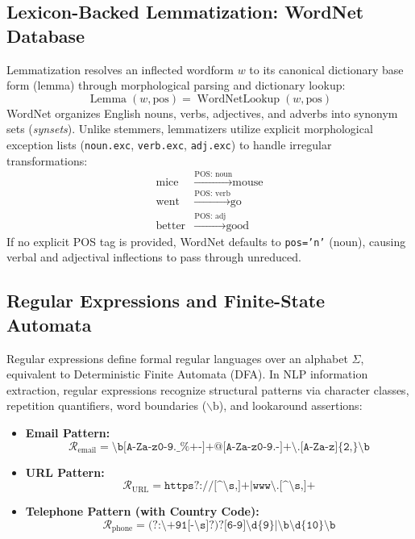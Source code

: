 \subsection{Lexicon-Backed Lemmatization: WordNet Database}
Lemmatization resolves an inflected wordform $w$ to its canonical dictionary base form (lemma) through morphological parsing and dictionary lookup:
\begin{equation}
    \operatorname{Lemma}(w, \text{pos}) = \operatorname{WordNetLookup}(w, \text{pos})
\end{equation}
WordNet organizes English nouns, verbs, adjectives, and adverbs into synonym sets (\textit{synsets}). Unlike stemmers, lemmatizers utilize explicit morphological exception lists (\texttt{noun.exc}, \texttt{verb.exc}, \texttt{adj.exc}) to handle irregular transformations:
\begin{align}
    \text{mice} &\xrightarrow{\text{POS: noun}} \text{mouse} \\
    \text{went} &\xrightarrow{\text{POS: verb}} \text{go} \\
    \text{better} &\xrightarrow{\text{POS: adj}} \text{good}
\end{align}
If no explicit POS tag is provided, WordNet defaults to \texttt{pos='n'} (noun), causing verbal and adjectival inflections to pass through unreduced.

\subsection{Regular Expressions and Finite-State Automata}
Regular expressions define formal regular languages over an alphabet $\Sigma$, equivalent to Deterministic Finite Automata (DFA). In NLP information extraction, regular expressions recognize structural patterns via character classes, repetition quantifiers, word boundaries ($\backslash\text{b}$), and lookaround assertions:
\begin{itemize}
    \item \textbf{Email Pattern:} 
    \begin{equation}
        \mathcal{R}_{\text{email}} = \texttt{\textbackslash b[A-Za-z0-9.\_\%+-]+@[A-Za-z0-9.-]+\textbackslash.[A-Za-z]\{2,\}\textbackslash b}
    \end{equation}
    \item \textbf{URL Pattern:}
    \begin{equation}
        \mathcal{R}_{\text{URL}} = \texttt{https?://[\textasciicircum\textbackslash s,]+|www\textbackslash .[\textasciicircum\textbackslash s,]+}
    \end{equation}
    \item \textbf{Telephone Pattern (with Country Code):}
    \begin{equation}
        \mathcal{R}_{\text{phone}} = \texttt{(?:\textbackslash+91[-\textbackslash s]?)?[6-9]\textbackslash d\{9\}|\textbackslash b\textbackslash d\{10\}\textbackslash b}
    \end{equation}
\end{itemize}

